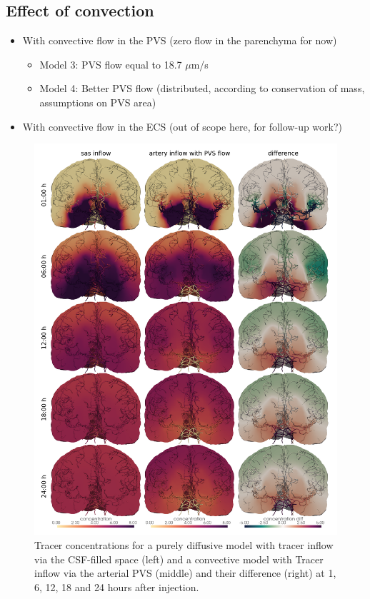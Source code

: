 \documentclass[fleqn,10pt]{wlscirep}
\begin{document}
\subsection*{Effect of convection}
\begin{itemize}
    \item 
    With convective flow in the PVS (zero flow in the parenchyma for now)
    \begin{itemize}
        \item 
        Model 3: PVS flow equal to 18.7 $\mu$m/s
        \item 
        Model 4: Better PVS flow (distributed, according to conservation of mass, assumptions on PVS area)
    \end{itemize}    
    \item 
    With convective flow in the ECS (out of scope here, for follow-up work?)
\end{itemize}

\begin{figure}
    \centering
    \includegraphics[width = 0.9 \textwidth]{modelB_modelC_overview.png}
    \caption{Tracer concentrations for a purely diffusive model with tracer inflow via the CSF-filled space (left) and a convective model with Tracer inflow via the arterial PVS (middle) and their difference (right) at 1, 6, 12, 18 and 24 hours after injection.}
    \label{fig:2}
\end{figure}
\end{document}
